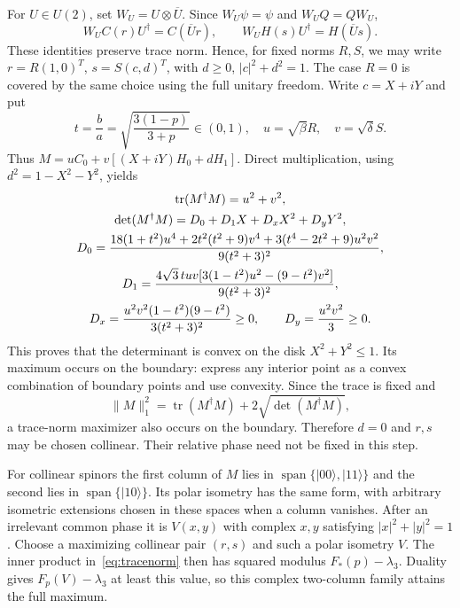 \documentclass[11pt]{article}
\newcommand{\ket}[1]{\lvert #1\rangle}
\newcommand{\tr}{\operatorname{tr}}
\begin{document}
For $U\in U(2)$, set $W_U=U\otimes\overline U$.
Since $W_U\psi=\psi$ and $W_UQ=QW_U$,
\[
 W_UC(r)U^\dagger=C(\overline U r),\qquad
 W_UH(s)U^\dagger=H(\overline U s).
\]
These identities preserve trace norm. Hence, for fixed norms $R,S$, we may
write $r=R(1,0)^T$, $s=S(c,d)^T$, with $d\geq0$,
$|c|^2+d^2=1$. The case $R=0$ is covered by the same choice using the
full unitary freedom. Write $c=X+iY$ and put
\[
 t=\frac ba=\sqrt{\frac{3(1-p)}{3+p}}\in(0,1),\quad
 u=\sqrt\beta R,\quad v=\sqrt\delta S.
\]
Thus $M=uC_0+v[(X+iY)H_0+dH_1]$. Direct multiplication, using
$d^2=1-X^2-Y^2$, yields
\begin{gather}
 \tr(M^\dagger M)=u^2+v^2,\notag\\
 \det(M^\dagger M)=D_0+D_1X+D_xX^2+D_yY^2,\label{eq:det}\\
 D_0=\frac{18(1+t^2)u^4+2t^2(t^2+9)v^4+
 3(t^4-2t^2+9)u^2v^2}{9(t^2+3)^2},\notag\\
 D_1=\frac{4\sqrt3\,tuv[3(1-t^2)u^2-(9-t^2)v^2]}{9(t^2+3)^2},\notag\\
 D_x=\frac{u^2v^2(1-t^2)(9-t^2)}{3(t^2+3)^2}\geq0,
 \qquad D_y=\frac{u^2v^2}{3}\geq0.\notag
\end{gather}
This proves that the determinant is convex on the disk $X^2+Y^2\leq1$.
Its maximum occurs on the boundary: express any interior point as a convex
combination of boundary points and use convexity. Since the trace is fixed and
\[
 \|M\|_1^2=\tr(M^\dagger M)+2\sqrt{\det(M^\dagger M)},
\]
a trace-norm maximizer also occurs on the boundary. Therefore $d=0$ and
$r,s$ may be chosen collinear. Their relative phase need not be fixed in
this step.

For collinear spinors the first column of $M$ lies in
$\operatorname{span}\{\ket{00},\ket{11}\}$ and the second lies in
$\operatorname{span}\{\ket{10}\}$. Its polar isometry has the same form,
with arbitrary isometric extensions chosen in these spaces when a column
vanishes. After an irrelevant common phase it is $V(x,y)$ with complex
$x,y$ satisfying $|x|^2+|y|^2=1$. Choose a maximizing collinear pair $(r,s)$
and such a polar isometry $V$. The inner product in~\eqref{eq:tracenorm}
then has squared modulus $F_*(p)-\lambda_3$. Duality gives
$F_p(V)-\lambda_3$ at least this value, so this complex two-column family
attains the full maximum.
\end{document}
